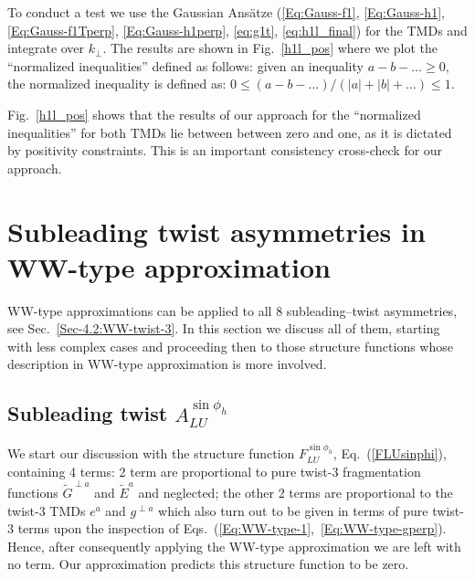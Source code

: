 \documentclass[a4paper,11pt]{article}
\newcommand{\blue}[1]{{\color{blue} #1}}
\newcommand{\ps}[1]{\blue{ #1}}
\begin{document}
To conduct a test we use the Gaussian Ans\"atze 
(\ref{Eq:Gauss-f1}, \ref{Eq:Gauss-h1}, \ref{Eq:Gauss-f1Tperp}, 
\ref{Eq:Gauss-h1perp}, \ref{eq:g1t}, \ref{eq:h1l_final}) for the
TMDs and integrate over $k_\perp$. The results are shown in 
Fig.~\ref{h1l_pos} where we plot the ``normalized inequalities'' 
defined as follows:
given an inequality $a-b-\dots \ge 0$, the normalized inequality 
is defined as: $0 \le (a-b-\dots)/(|a|+|b|+\dots) \le 1$.

Fig.~\ref{h1l_pos} shows that the results of our approach for the 
``normalized inequalities'' for both TMDs lie between between
zero and one, as it is dictated by positivity constraints.
This is an important consistency cross-check for our approach.

\newpage
\section{Subleading twist asymmetries in WW-type approximation}
\label{Sec-7:twist-3-and-WW}

WW-type approximations can be applied to all 8 subleading--twist asymmetries,
see Sec.~\ref{Sec-4.2:WW-twist-3}. \ps{In this section we discuss all of them,
starting with less complex cases and proceeding then to those structure 
functions whose description in WW-type approximation is more involved.}

\subsection{\boldmath Subleading twist  $A_{LU}^{\sin\phi_h}$}
\label{Sec-7.1:FLU}

We start our discussion with the structure function $F_{LU}^{\sin\phi_h}$,
Eq.~(\ref{FLUsinphi}), containing 4 terms: 
2 term are proportional to pure twist-3 fragmentation functions 
$\tilde{G}^{\perp a}$ and $\tilde{E}^a$ and neglected; the other 2
terms are proportional to the twist-3 TMDs $e^a$ and $g^{\perp a}$ which
also turn out to be given in terms of pure twist-3 terms upon the 
inspection of Eqs.~(\ref{Eq:WW-type-1},~\ref{Eq:WW-type-gperp}).
Hence, after consequently applying the WW-type approximation we are left 
with no term. Our approximation predicts this structure function to be zero.
\end{document}
